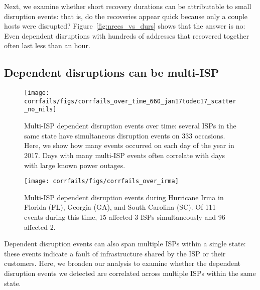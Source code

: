 Next, we examine whether short recovery durations can be attributable
to small disruption events: that is, do the recoveries appear quick
because only a couple hosts were disrupted?
%
Figure~\ref{fig:nrecs_vs_durs} shows that the answer is no: Even
dependent disruptions with hundreds of addresses that recovered
together often last less than an hour.

\subsection{Dependent disruptions can be multi-ISP}

\begin{figure}[t]
\centering
\texttt{[image: corrfails/figs/corrfails\_over\_time\_660\_jan17todec17\_scatter\_no\_nils]}
\caption[Multi-ISP dependent disruption events over time]{
\label{fig:multiisp_over_time}
Multi-ISP dependent disruption events over time: several ISPs in the same
state have simultaneous disruption events on 333 occasions. Here, we
show how many events occurred on each day of the year in 2017. Days
with many multi-ISP events often correlate with days with large known power outages.}
\end{figure}

\begin{figure}[t]
\centering
\texttt{[image: corrfails/figs/corrfails\_over\_irma]}
\caption[Multi-ISP dependent disruption events during Hurricane Irma]{
\label{fig:corrfails_over_irma}
Multi-ISP dependent disruption events during Hurricane Irma in Florida (FL), Georgia (GA),
and South Carolina (SC). Of 111 events during this time, 15 affected 3
ISPs simultaneously and 96 affected 2.}
\end{figure}

Dependent disruption events can also span multiple ISPs within a
single state: these events indicate a fault of infrastructure shared
by the ISP or their customers. 
%
Here, we broaden our analysis to examine whether the dependent
disruption events we detected are
correlated across multiple ISPs within the same state.

